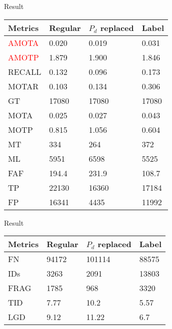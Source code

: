     \begin{frame}{Result}
        \begin{table}
            \begin{tabular}{l l l l}
                \toprule
                Metrics & Regular & $P_d$ replaced & Label\\
                \midrule
                \textcolor{red}{AMOTA}        &0.020 & 0.019          &0.031               \\
                \textcolor{red}{AMOTP}     &1.879   & 1.900          & 1.846               \\
                RECALL     &0.132    & 0.096           & 0.173               \\
                MOTAR     &0.103    & 0.134          & 0.306               \\
                GT     &17080    & 17080          & 17080               \\
                MOTA     &0.025    & 0.027          & 0.043               \\
                MOTP     &0.815    & 1.056          & 0.604               \\
                MT     &334    & 264           & 372               \\
                ML     &5951    & 6598           & 5525               \\
                
                FAF     &194.4    & 231.9          & 108.7              \\
                TP     &22130    & 16360          & 17184               \\
                FP     &16341    & 4435          & 11992               \\
    
                \bottomrule
            \end{tabular}
        \end{table}
    \end{frame}
    
    
    \begin{frame}{Result}
        \begin{table}
            \begin{tabular}{l l l l}
                \toprule
                Metrics & Regular & $P_d$ replaced & Label\\
                \midrule
                FN     &94172    & 101114         & 88575               \\
                IDs     &3263    & 2091          & 13803               \\
                FRAG     &1785    & 968           & 3320               \\
                TID     &7.77    & 10.2           & 5.57               \\
                LGD     &9.12    & 11.22           & 6.7             \\
    
                \bottomrule
            \end{tabular}
        \end{table}
    \end{frame}
    